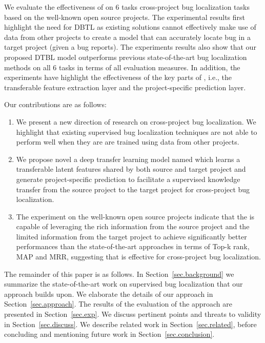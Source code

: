 
We evaluate the effectiveness of \TRANPCNN on 6 tasks cross-project bug localization tasks based on the well-known open source projects. The experimental results first highlight the need for DBTL as existing solutions cannot effectively make use of data from other projects to create a model that can accurately locate bug in a target project (given a bug reports). The experiments results also show that our proposed DTBL model \TRANPCNN outperforms previous state-of-the-art bug localization methods on all 6 tasks in terms of all evaluation measures. In addition, the experiments have highlight the effectiveness of the key parts of \TRANPCNN, i.e., the transferable feature extraction layer and the project-specific prediction layer.

Our contributions are as follows:

\begin{enumerate}

\item We present a new direction of research on cross-project bug localization. We highlight that existing supervised bug localization techniques are not able to perform well when they are are trained using data from other projects. 
    
\item We propose novel a deep transfer learning model named \TRANPCNN which learns a transferable latent features shared by both source and target project and generate project-specific prediction to facilitate a supervised knowledge transfer from the source project to the target project for cross-project bug localization.



\item The experiment on the well-known open source projects indicate that the \TRANPCNN is capable of leveraging the rich information from the source project and the limited information from the target project to achieve significantly better performances than the state-of-the-art approaches in terms of Top-k rank, MAP and MRR, suggesting that \TRANPCNN is effective for cross-project bug localization.


\end{enumerate}

The remainder of this paper is as follows. In Section~\ref{sec.background} we summarize the state-of-the-art work on supervised bug localization that our approach builds upon. We elaborate the details of our approach in Section~\ref{sec.approach}. The results of the evaluation of the approach are presented in Section~\ref{sec.exp}. We discuss pertinent points and threats to validity in Section~\ref{sec.discuss}. We describe related work in Section~\ref{sec.related}, before concluding and mentioning future work in Section~\ref{sec.conclusion}. 

